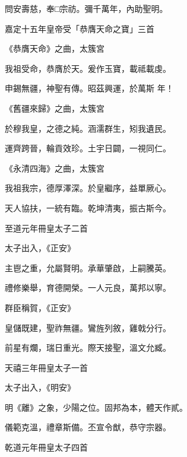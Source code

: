 \begin{pinyinscope}
 問安壽慈，奉□宗祊。彌千萬年，內助聖明。



 嘉定十五年皇帝受「恭膺天命之寶」三首



 《恭膺天命》之曲，太簇宮



 我祖受命，恭膺於天。爰作玉寶，載祗載虔。



 申錫無疆，神聖有傳。昭茲興運，於萬斯
 年！



 《舊疆來歸》之曲，太簇宮



 於穆我皇，之德之純。涵濡群生，矧我遺民。



 運齊跨晉，輪貢效珍。土宇日闢，一視同仁。



 《永清四海》之曲，太簇宮



 我祖我宗，德厚澤深。於皇繼序，益單厥心。



 天人協扶，一統有臨。乾坤清夷，振古斯今。



 至道元年冊皇太子二首



 太子出入，《正安》



 主鬯之重，允屬賢明。承華肇啟，上嗣騰英。



 禮修樂舉，育德開榮。一人元良，萬邦以寧。



 群臣稱賀，《正安》



 皇儲既建，聖祚無疆。鸞旌列敘，雞戟分行。



 前星有爛，瑞日重光。際天接聖，溫文允臧。



 天禧三年冊皇太子一首



 太子出入，《明安》



 明《離》之象，少陽之位。固邦為本，體天作貳。



 儀範克溫，禮章斯備。丕宣令猷，恭守宗器。



 乾道元年冊皇太子四首




\end{pinyinscope}
